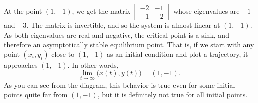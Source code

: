 \begin{example}
At the point $(1,-1)$, we get the matrix
$\left[ \begin{smallmatrix} -2 & -1 \\ -1 & -2 \end{smallmatrix} \right]$
whose
eigenvalues are $-1$ and $-3$.
The matrix is invertible, and so the system is almost linear at $(1,-1)$.
As both eigenvalues are real and negative, the critical
point is a sink, and therefore an asymptotically stable equilibrium point.
That is, if we start with any point $(x_i,y_i)$ close to $(1,-1)$ as
an initial condition and plot a trajectory, it approaches $(1,-1)$.
In other words,
\begin{equation*}
\lim_{t \to \infty} \bigl( x(t), y(t) \bigr) = (1,-1) .
\end{equation*}
As you can 
see from the diagram, this behavior is true even for some
initial points quite far from $(1,-1)$, but it is definitely not true for all
initial points.
\end{example}

